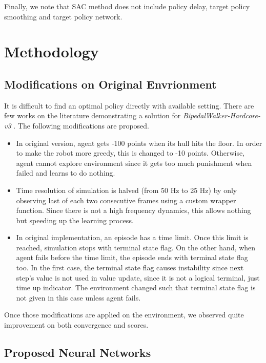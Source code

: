 \documentclass[a4paper, 12pt]{article} %
\begin{document}
Finally, we note that SAC method does not include policy delay, target policy smoothing and target policy network. 

\section{Methodology}

\subsection{Modifications on Original Envrionment}

It is difficult to find an optimal policy directly with available setting. 
There are few works on the literature demonstrating a solution for \textit{BipedalWalker-Hardcore-v3} . 
The following modifications are proposed.

\begin{itemize}
	\item In original version, agent gets -100 points when its hull hits the floor. 
	In order to make the robot more greedy, this is changed to -10 points. 
	Otherwise, agent cannot explore environment since it gets too much punishment when failed and learns to do nothing.
	\item Time resolution of simulation is halved (from 50 Hz to 25 Hz) by only observing last of each two consecutive frames using a custom wrapper function. 
	Since there is not a high frequency dynamics, this allows nothing but speeding up the learning process.
	\item In original implementation, an episode has a time limit. 
	Once this limit is reached, simulation stops with terminal state flag. 
	On the other hand, when agent fails before the time limit, the episode ends with terminal state flag too. 
	In the first case, the terminal state flag causes instability since next step's value is not used in value update, since it is not a logical terminal, just time up indicator.
	The environment changed such that terminal state flag is not given in this case unless agent fails. 
\end{itemize}

Once those modifications are applied on the environment, we observed quite improvement on both convergence and scores. 

\subsection{Proposed Neural Networks}
\label{sec:proposed_networks}
\end{document}
